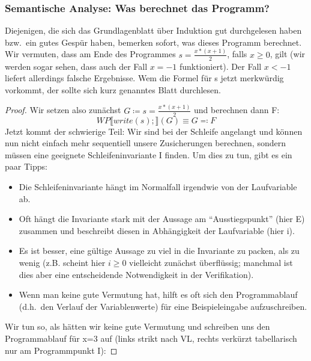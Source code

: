 \documentclass[hidelinks]{article}
\theoremstyle{plain}
\theoremstyle{definition}
\theoremstyle{rem}
\begin{document}
\begin{sloppypar}
\subsubsection{Semantische Analyse: Was berechnet das Programm?}
Diejenigen, die sich das Grundlagenblatt über Induktion gut durchgelesen haben bzw.\ ein gutes Gespür haben, bemerken sofort, was dieses Programm berechnet. Wir vermuten, dass am Ende des Programmes $s=\frac{x*(x+1)}{2}$, falls $x\ge 0$, gilt (wir werden sogar sehen, dass auch der Fall $x=-1$ funktioniert). Der Fall $x<-1$ liefert allerdings falsche Ergebnisse. Wem die Formel für s jetzt merkwürdig vorkommt, der sollte sich kurz genanntes Blatt durchlesen.
\begin{proof}
Wir setzen also zunächst $G\coloneqq s=\frac{x*(x+1)}{2}$ und berechnen dann F:
\begin{equation*}
WP\llbracket write(s);\rrbracket(G)\equiv G\eqqcolon F 
\end{equation*}
Jetzt kommt der schwierige Teil: Wir sind bei der Schleife angelangt und können nun nicht einfach mehr sequentiell unsere Zusicherungen berechnen, sondern müssen eine geeignete Schleifeninvariante I finden. Um dies zu tun, gibt es ein paar Tipps:
\begin{itemize}
\item Die Schleifeninvariante hängt im Normalfall irgendwie von der Laufvariable ab.
\item Oft hängt die Invariante stark mit der Aussage am ``Ausstiegspunkt'' (hier E) zusammen und beschreibt diesen in Abhängigkeit der Laufvariable (hier i).
\item Es ist besser, eine gültige Aussage zu viel in die Invariante zu packen, als zu wenig (z.B. scheint hier $i\ge 0$ vielleicht zunächst überflüssig; manchmal ist dies aber eine entscheidende Notwendigkeit in der Verifikation).
\item Wenn man keine gute Vermutung hat, hilft es oft sich den Programmablauf (d.h.\ den Verlauf der Variablenwerte) für eine Beispieleingabe aufzuschreiben.
\end{itemize}
Wir tun so, als hätten wir keine gute Vermutung und schreiben uns den Programmablauf für x=3 auf (links strikt nach VL, rechts verkürzt tabellarisch nur am Programmpunkt I):
\fboxsep=0pt
\end{proof}
\end{sloppypar}
\end{document}

